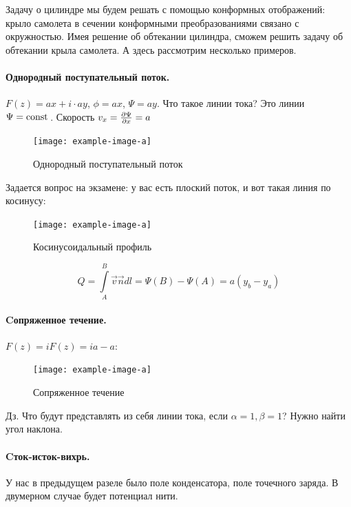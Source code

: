 Задачу о цилиндре мы будем решать с помощью конформных отображений: крыло самолета в сечении конформными преобразованиями связано с окружностью. Имея решение об обтекании цилиндра, сможем решить задачу об обтекании крыла самолета. А здесь рассмотрим несколько примеров.

\paragraph{Однородный поступательный поток.} $F(z)=ax+i\cdot ay$, $\phi=ax$, $\Psi=ay$. Что такое линии тока? Это линии $\Psi=\mathrm{const}\,$. Скорость $v_x=\pdv{\Psi}{x}=a$

\begin{figure}[h!]
    \centering
    \texttt{[image: example-image-a]}
    \caption{Однородный поступательный поток}
    \label{fig:figure1}
\end{figure}

Задается вопрос на экзамене: у вас есть плоский поток, и вот такая линия по косинусу:

\begin{figure}[h!]
    \centering
    \texttt{[image: example-image-a]}
    \caption{Косинусоидальный профиль}
    \label{fig:figure1}
\end{figure}

\begin{equation}
	Q=\int\limits_{A}^{B} \vec{v}\vec{n}dl=\Psi(B)-\Psi(A)=a(y_b-y_a)
\end{equation}


\paragraph{Cопряженное течение.} $F(z)=iF(z)=ia-a$:

\begin{figure}[h!]
    \centering
    \texttt{[image: example-image-a]}
    \caption{Сопряженное течение}
    \label{fig:figure1}
\end{figure}

Дз. Что будут представлять из себя линии тока, если $\alpha=1,\beta=1$? Нужно найти угол наклона.

\paragraph{Cток-исток-вихрь.} У нас в предыдущем разеле было поле конденсатора, поле точечного заряда. В двумерном случае будет потенциал нити.

